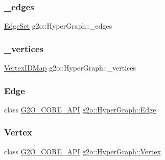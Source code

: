 \subsubsection{\texorpdfstring{\+\_\+edges}{\_edges}}
{\footnotesize\ttfamily \mbox{\hyperlink{classg2o_1_1_hyper_graph_a5e2970e236c0dcb4eff7c205d7b6b4ae}{Edge\+Set}} g2o\+::\+Hyper\+Graph\+::\+\_\+edges\hspace{0.3cm}{\ttfamily [protected]}}

\mbox{\label{classg2o_1_1_hyper_graph_a83132c77c8d0896581d168cbc72f673a}} 
\subsubsection{\texorpdfstring{\+\_\+vertices}{\_vertices}}
{\footnotesize\ttfamily \mbox{\hyperlink{classg2o_1_1_hyper_graph_a97307eac064ebf4b3e2cfbf0718035b5}{Vertex\+I\+D\+Map}} g2o\+::\+Hyper\+Graph\+::\+\_\+vertices\hspace{0.3cm}{\ttfamily [protected]}}

\mbox{\label{classg2o_1_1_hyper_graph_a59ab1fe84b0728a65a0ba15fce9b9cf7}} 
\subsubsection{\texorpdfstring{Edge}{Edge}}
{\footnotesize\ttfamily class \mbox{\hyperlink{g2o__core__api_8h_a7a8d7648d6f1e26632566f335751d064}{G2\+O\+\_\+\+C\+O\+R\+E\+\_\+\+A\+PI}} \mbox{\hyperlink{classg2o_1_1_hyper_graph_1_1_edge}{g2o\+::\+Hyper\+Graph\+::\+Edge}}}

\mbox{\label{classg2o_1_1_hyper_graph_a2aca385a3acb87b4f4365765afd10093}} 
\subsubsection{\texorpdfstring{Vertex}{Vertex}}
{\footnotesize\ttfamily class \mbox{\hyperlink{g2o__core__api_8h_a7a8d7648d6f1e26632566f335751d064}{G2\+O\+\_\+\+C\+O\+R\+E\+\_\+\+A\+PI}} \mbox{\hyperlink{classg2o_1_1_hyper_graph_1_1_vertex}{g2o\+::\+Hyper\+Graph\+::\+Vertex}}}



